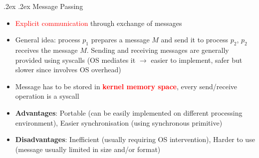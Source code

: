 \documentclass[13pt,landscape,a4paper]{article}
\makeatletter
\renewcommand{\subsection}{\@startsection{subsection}{1}{0mm}%
    {.2ex}%
    {.2ex}%
    {\sffamily\bfseries}}
\makeatother
\begin{document}
\begin{multicols*}{3}
        \subsection{Message Passing}
        \begin{itemize}
            \item \textcolor{red}{Explicit communication} through exchange of messages
            \item General idea: process $p_1$ prepares a message $M$ and send it to process $p_2$, $p_2$ receives the message $M$. Sending and receiving messages are generally provided using syscalls (OS mediates it $\rightarrow$ easier to implement, safer but slower since involves OS overhead)
            \item Message has to be stored in \textbf{\textcolor{red}{kernel memory space}}, every send/receive operation is a syscall
            \item \textbf{Advantages}: Portable (can be easily implemented on different processing environment), Easier synchronisation (using synchronous primitive)
            \item \textbf{Disadvantages}: Inefficient (usually requiring OS intervention), Harder to use (message usually limited in size and/or format)
        \end{itemize}

\end{multicols*}
\end{document}
